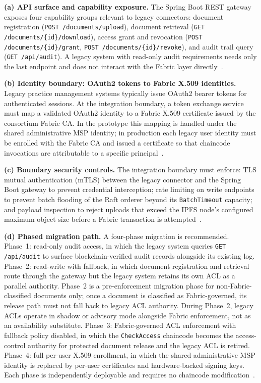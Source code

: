 \documentclass{ieeeaccess}
\begin{document}
\textbf{(a) API surface and capability exposure.} The Spring Boot
REST gateway exposes four capability groups relevant to legacy
connectors: document registration (\texttt{POST /documents/upload}),
document retrieval (\texttt{GET /documents/\{id\}/download}), access
grant and revocation (\texttt{POST /documents/\{id\}/grant},
\texttt{POST /documents/\{id\}/revoke}), and audit trail query
(\texttt{GET /api/audit}). A legacy system with read-only audit
requirements needs only the last endpoint and does not interact with
the Fabric layer directly~\cite{springBoot325}.

\textbf{(b) Identity boundary: OAuth2 tokens to Fabric X.509
identities.} Legacy practice management systems typically issue
OAuth2 bearer tokens for authenticated sessions. At the integration
boundary, a token exchange service must map a validated OAuth2
identity to a Fabric X.509 certificate issued by the consortium
Fabric CA. In the prototype this mapping is handled under the shared
administrative MSP identity; in production each legacy user identity
must be enrolled with the Fabric CA and issued a certificate so that
chaincode invocations are attributable to a specific
principal~\cite{fabricCADoc,rfc7519jwt}.

\textbf{(c) Boundary security controls.} The integration boundary
must enforce: TLS mutual authentication (mTLS) between the legacy
connector and the Spring Boot gateway to prevent credential
interception; rate limiting on write endpoints to prevent batch
flooding of the Raft orderer beyond its \texttt{BatchTimeout}
capacity; and payload inspection to reject uploads that exceed the
IPFS node's configured maximum object size before a Fabric
transaction is attempted~\cite{nist80053}.

\textbf{(d) Phased migration path.} A four-phase migration is
recommended. Phase~1: read-only audit access, in which the legacy
system queries \texttt{GET /api/audit} to surface blockchain-verified
audit records alongside its existing log. Phase~2: read-write with
fallback, in which document registration and retrieval route through
the gateway but the legacy system retains its own ACL as a parallel
authority. Phase~2 is a pre-enforcement migration phase for
non-Fabric-classified documents only; once a document is classified as
Fabric-governed, its release path must not fall back to legacy ACL
authority. During Phase~2, legacy ACLs operate in shadow or advisory mode
alongside Fabric enforcement, not as an availability substitute. Phase~3: Fabric-governed ACL enforcement with fallback policy
disabled, in which the \texttt{CheckAccess} chaincode becomes the
access-control authority for protected document release and the
legacy ACL is retired. Phase~4: full per-user
X.509 enrollment, in which the shared administrative MSP identity is
replaced by per-user certificates and hardware-backed signing keys.
Each phase is independently deployable and requires no chaincode
modification~\cite{fabricChaincodeLifecycleDoc,nist80053}.
\end{document}
